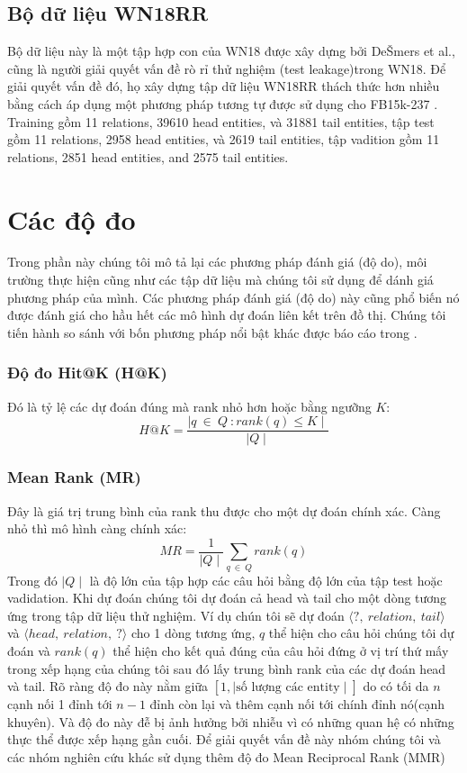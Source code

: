 \subsection{Bộ dữ liệu WN18RR}

Bộ dữ liệu này là một tập hợp con của WN18 được xây dựng bởi DeŠmers et al.\cite{dettmers2017convolutional}, cũng là người giải quyết vấn đề rò rỉ thử nghiệm (test leakage)trong WN18. Để giải quyết vấn đề đó, họ xây dựng tập dữ liệu WN18RR thách thức hơn nhiều bằng cách áp dụng một phương pháp tương tự được sử dụng cho FB15k-237 \cite{toutanova2015observed}. Training gồm 11 relations, 39610 head entities, và 31881 tail entities, tập test gồm 11 relations, 2958 head entities, và 2619 tail entities, tập vadition gồm 11 relations, 2851 head entities, and 2575 tail entities.

\section{Các độ đo}
Trong phần này chúng tôi mô tả lại các phương pháp đánh giá (độ do), môi trường thực hiện cũng như các tập dữ liệu mà chúng tôi sử dụng để dánh giá phương pháp của mình. Các phương pháp đánh giá (độ do) này cũng phổ biến nó được đánh giá cho hầu hết các mô hình dự đoán liên kết trên đồ thị. Chúng tôi tiến hành so sánh với bốn phương pháp nổi bật khác được báo cáo trong \cite{rossi2020knowledge}.

\subsubsection{Độ đo Hit@K (H@K)}

Đó là tỷ lệ các dự đoán đúng mà rank nhỏ hơn hoặc bằng ngưỡng \(K\):
\[H@K = \frac{\mid {q ~\in ~Q~: rank(q) \leq K} \mid}{\mid Q \mid}\]

\subsubsection{Mean Rank (MR)}

Đây là giá trị trung bình của rank thu được cho một dự đoán chính xác. Càng nhỏ thì mô hình càng chính xác:
\[MR = \frac{1}{\mid Q \mid} \sum_{q ~\in~ Q} rank(q) \]
Trong đó \(\mid Q \mid\) là độ lớn của tập hợp các câu hỏi bằng độ lớn của tập test hoặc vadidation. Khi dự đoán chúng tôi dự đoán cả head và tail cho một dòng tương ứng trong tập dữ liệu thử nghiệm. Ví dụ chún tôi sẽ dự đoán \(\langle ?,~ relation,~ tail \rangle\) và \(\langle head,~ relation,~ ?\rangle\) cho 1 dòng tương ứng, \(q\) thể hiện cho câu hỏi chúng tôi dự đoán và \(rank(q)\) thể hiện cho kết quả đúng của câu hỏi đứng ở vị trí thứ mấy trong xếp hạng của chúng tôi sau đó lấy trung bình rank của các dự đoán head và tail. Rõ ràng độ đo này nằm giữa \([1, \mid \text{số lượng các entity} \mid]\) do có tối da \(n\) cạnh nối 1 đỉnh tới \(n-1\) đỉnh còn lại và thêm cạnh nối tới chính đỉnh nó(cạnh khuyên). Và độ đo này đễ bị ảnh hưởng bởi nhiễu vì có những quan hệ có những thực thể được xếp hạng gần cuối. Để giải quyết vấn đề này nhóm chúng tôi và các nhóm nghiên cứu khác sử dụng thêm độ đo Mean Reciprocal Rank (MMR)

